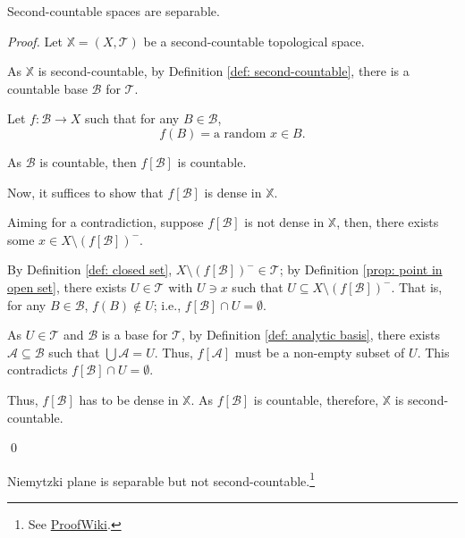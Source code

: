 \begin{proposition}
	Second-countable spaces are separable.
	
	\begin{proof}
		Let $\mathbb X = (X, \mathcal T)$ be a second-countable topological space.
		
		As $\mathbb X$ is second-countable, by Definition \ref{def: second-countable}, there is a countable base $\mathcal B$ for $\mathcal T$.
		
		Let $f: \mathcal B \to X$ such that for any $B \in \mathcal B$,
		$$
		f(B) = \text{a random } x \in B.
		$$
		
		As $\mathcal B$ is countable, then $f[\mathcal B]$ is countable.
		
		Now, it suffices to show that $f[\mathcal B]$ is dense in $\mathbb X$.
		
		Aiming for a contradiction, suppose $f[\mathcal B]$ is not dense in $\mathbb X$, then, there exists some $x \in X \setminus (f[\mathcal B])^-$.
		
		By Definition \ref{def: closed set}, $X \setminus (f[\mathcal B])^- \in \mathcal T$; by Definition \ref{prop: point in open set}, there exists $U \in \mathcal T$ with $U \ni x$ such that $U \subseteq X \setminus (f[\mathcal B])^-$. That is, for any $B \in \mathcal B$, $f(B) \notin U$; i.e., $f[\mathcal B] \cap U = \emptyset$.
		
		As $U \in \mathcal T$ and $\mathcal B$ is a base for $\mathcal T$, by Definition \ref{def: analytic basis}, there exists $\mathcal A \subseteq \mathcal B$ such that $\bigcup \mathcal A = U$. Thus, $f[\mathcal A]$ must be a non-empty subset of $U$. This contradicts $f[\mathcal B] \cap U = \emptyset$.
		
		Thus, $f[\mathcal B]$ has to be dense in $\mathbb X$. As $f[\mathcal B]$ is countable, therefore, $\mathbb X$ is second-countable.
		
		\qed
	\end{proof}
\end{proposition}


\begin{example}
	Niemytzki plane is separable but not second-countable.\footnote{
		See \href{https://proofwiki.org/wiki/Definition:Niemytzki_Plane}{ProofWiki}.
	}
\end{example}


